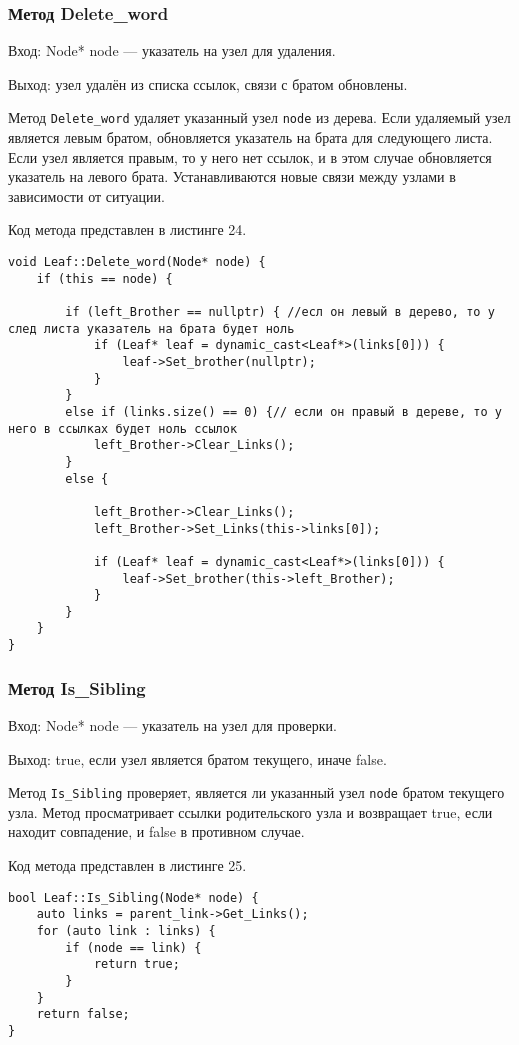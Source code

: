 \documentclass[10pt,a4paper,final]{article} %
\begin{document}
\subsubsection{Метод Delete\_word } 
Вход: Node* node — указатель на узел для удаления. \par
Выход: узел удалён из списка ссылок, связи с братом обновлены. \par
\par Метод \texttt{Delete\_word} удаляет указанный узел \texttt{node} из дерева. Если удаляемый узел является левым братом, обновляется указатель на брата для следующего листа. Если узел является правым, то у него нет ссылок, и в этом случае обновляется указатель на левого брата. Устанавливаются новые связи между узлами в зависимости от ситуации.

Код метода представлен в листинге 24. \begin{lstlisting}[label=deleteWordByReferenceMethod, caption = Метод Delete\_word для класса Leaf] 
void Leaf::Delete_word(Node* node) {
	if (this == node) {
		
		if (left_Brother == nullptr) { //есл он левый в дерево, то у след листа указатель на брата будет ноль
			if (Leaf* leaf = dynamic_cast<Leaf*>(links[0])) {
				leaf->Set_brother(nullptr);
			}
		}
		else if (links.size() == 0) {// если он правый в дереве, то у него в ссылках будет ноль ссылок
			left_Brother->Clear_Links();
		}
		else {
			
			left_Brother->Clear_Links();
			left_Brother->Set_Links(this->links[0]);
			
			if (Leaf* leaf = dynamic_cast<Leaf*>(links[0])) {
				leaf->Set_brother(this->left_Brother);
			}
		}
	}
}\end{lstlisting}



\subsubsection{Метод Is\_Sibling} 
Вход: Node* node — указатель на узел для проверки. \par
Выход: true, если узел является братом текущего, иначе false. \par
\par Метод \texttt{Is\_Sibling} проверяет, является ли указанный узел \texttt{node} братом текущего узла. Метод просматривает ссылки родительского узла и возвращает true, если находит совпадение, и false в противном случае.

Код метода представлен в листинге 25. \begin{lstlisting}[label=isSiblingMethod, caption = Метод Is\_Sibling для класса Leaf] 
bool Leaf::Is_Sibling(Node* node) {
	auto links = parent_link->Get_Links();
	for (auto link : links) {
		if (node == link) {
			return true;
		}
	}
	return false;
}\end{lstlisting}
\end{document}
